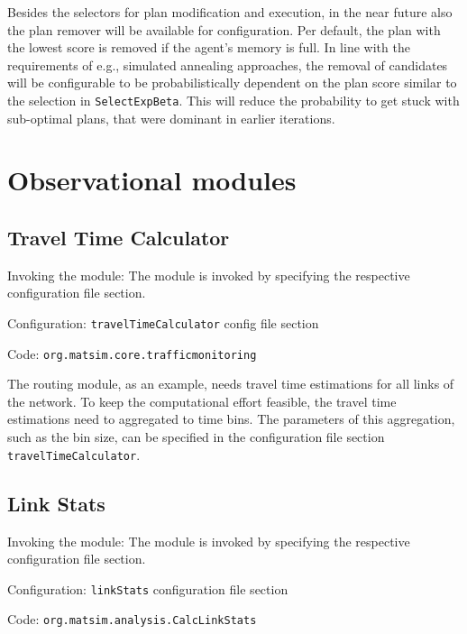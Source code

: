 Besides the selectors for plan modification and execution, in the near future also the plan remover will be available for configuration. Per default, the plan with the lowest score is removed if the agent's memory is full. In line with the requirements of e.g., simulated annealing approaches, the removal of candidates will be configurable to be probabilistically dependent on the plan score similar to the selection in \lstinline|SelectExpBeta|. This will reduce the probability to get stuck with sub-optimal plans, that were dominant in earlier iterations.

\section{Observational modules}
\label{sec:specialpurpose}

\subsection{Travel Time Calculator}
\label{sec:ttc}
\begin{compactitem}
\item Invoking the module: The module is invoked by specifying the respective configuration file section.
\item Configuration: \lstinline|travelTimeCalculator| config file section
\item Code: \lstinline|org.matsim.core.trafficmonitoring|
\end{compactitem}

The routing module, as an example, needs travel time estimations for all links of the network. To keep the computational effort feasible, the travel time estimations need to aggregated to time bins. The parameters of this aggregation, such as the bin size, can be specified in the configuration file section \lstinline|travelTimeCalculator|.

\subsection{Link Stats}
\label{sec:linkStats}
\begin{compactitem}
\item Invoking the module: The module is invoked by specifying the respective configuration file section.
\item Configuration: \lstinline|linkStats| configuration file section
\item Code: \lstinline|org.matsim.analysis.CalcLinkStats|
\end{compactitem}

